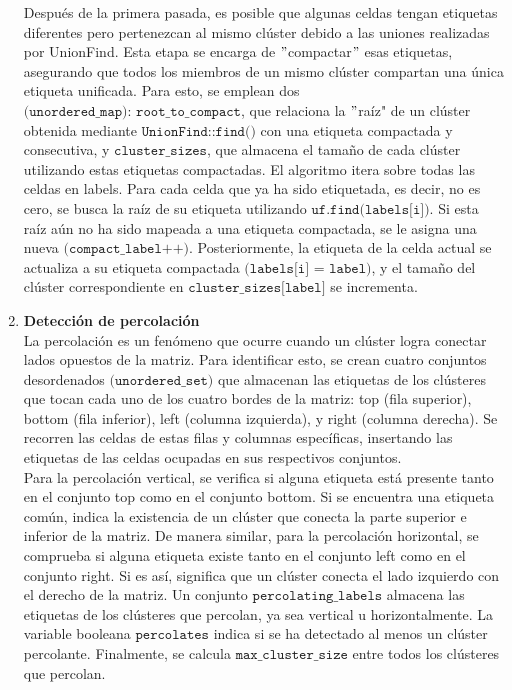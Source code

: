 \documentclass[12pt,a4paper]{article}
\begin{document}
\begin{enumerate}[label=\textbf{\arabic*)}, ref=\arabic*)]
    Después de la primera pasada, es posible que algunas celdas tengan etiquetas diferentes pero pertenezcan al mismo clúster debido a las uniones realizadas por UnionFind. Esta etapa se encarga de $"$compactar$"$ esas etiquetas, asegurando que todos los miembros de un mismo clúster compartan una única etiqueta unificada. Para esto, se emplean dos $\texttt{(unordered\_map): root\_to\_compact}$, que relaciona la $"$raíz" de un clúster obtenida mediante $\texttt{UnionFind::find()}$ con una etiqueta compactada y consecutiva, y $\texttt{cluster\_sizes}$, que almacena el tamaño de cada clúster utilizando estas etiquetas compactadas. El algoritmo itera sobre todas las celdas en labels. Para cada celda que ya ha sido etiquetada, es decir, no es cero, se busca la raíz de su etiqueta utilizando $\texttt{uf.find(labels[i])}$. Si esta raíz aún no ha sido mapeada a una etiqueta compactada, se le asigna una nueva $\texttt{(compact\_label++)}$. Posteriormente, la etiqueta de la celda actual se actualiza a su etiqueta compactada $\texttt{(labels[i] = label)}$, y el tamaño del clúster correspondiente en $\texttt{cluster\_sizes[label]}$ se incrementa.
    \item \textbf{Detección de percolación}\\
    La percolación es un fenómeno que ocurre cuando un clúster logra conectar lados opuestos de la matriz. Para identificar esto, se crean cuatro conjuntos desordenados $\texttt{(unordered\_set)}$ que almacenan las etiquetas de los clústeres que tocan cada uno de los cuatro bordes de la matriz: top (fila superior), bottom (fila inferior), left (columna izquierda), y right (columna derecha). Se recorren las celdas de estas filas y columnas específicas, insertando las etiquetas de las celdas ocupadas en sus respectivos conjuntos.
\\

Para la percolación vertical, se verifica si alguna etiqueta está presente tanto en el conjunto top como en el conjunto bottom. Si se encuentra una etiqueta común, indica la existencia de un clúster que conecta la parte superior e inferior de la matriz. De manera similar, para la percolación horizontal, se comprueba si alguna etiqueta existe tanto en el conjunto left como en el conjunto right. Si es así, significa que un clúster conecta el lado izquierdo con el derecho de la matriz. Un conjunto $\texttt{percolating\_labels}$ almacena las etiquetas de los clústeres que percolan, ya sea vertical u horizontalmente. La variable booleana $\texttt{percolates}$ indica si se ha detectado al menos un clúster percolante. Finalmente, se calcula $\texttt{max\_cluster\_size}$ entre todos los clústeres que percolan.


\end{enumerate}
\end{document}
